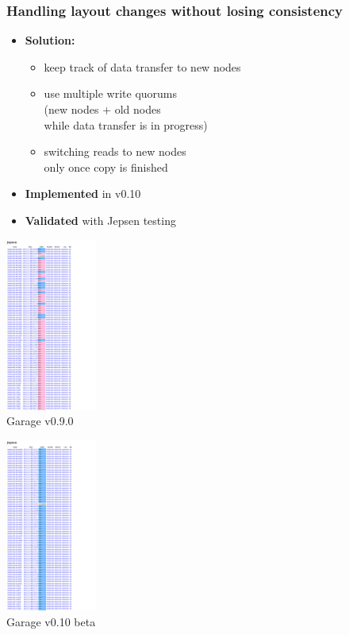 \documentclass[aspectratio=169]{beamer}
\begin{document}
\begin{frame}
	\frametitle{Handling layout changes without losing consistency}
	\begin{minipage}{.55\textwidth}
		\begin{itemize}
			\item \textbf{Solution:}\\
				\vspace{.5em}
				\begin{itemize}
					\item keep track of data transfer to new nodes
						\vspace{.5em}
					\item use multiple write quorums\\
						(new nodes + old nodes\\
						while data transfer is in progress)
						\vspace{.5em}
					\item switching reads to new nodes\\
						only once copy is finished
				\end{itemize}
				\vspace{1em}
			\item \textbf{Implemented} in v0.10
				\vspace{1em}
			\item \textbf{Validated} with Jepsen testing
		\end{itemize}
	\end{minipage}
	\begin{minipage}{.23\textwidth}
		\includegraphics[width=3cm]{../assets/jepsen-0.9.png}\\
		{\footnotesize Garage v0.9.0}
	\end{minipage}
	\begin{minipage}{.2\textwidth}
		\includegraphics[width=3cm]{../assets/jepsen-0.10.png}\\
		{\footnotesize Garage v0.10 beta}
	\end{minipage}
\end{frame}
\end{document}
